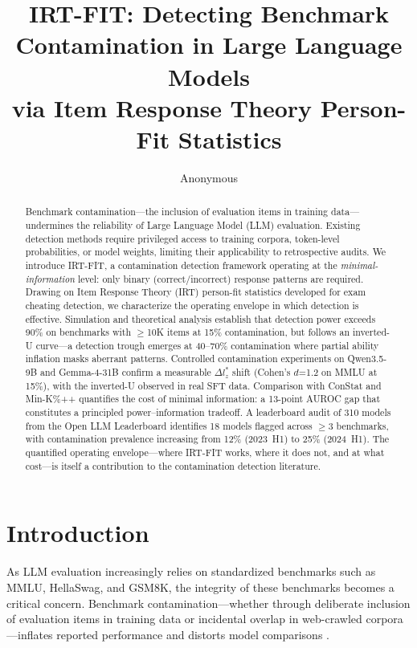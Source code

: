 \documentclass[11pt,a4paper]{article}
\title{IRT-FIT: Detecting Benchmark Contamination in Large Language Models\\via Item Response Theory Person-Fit Statistics}
\author{Anonymous}
\date{}
\begin{document}
\maketitle

\begin{abstract}
Benchmark contamination---the inclusion of evaluation items in training data---undermines the reliability of Large Language Model (LLM) evaluation.
Existing detection methods require privileged access to training corpora, token-level probabilities, or model weights, limiting their applicability to retrospective audits.
We introduce \textsc{IRT-FIT}, a contamination detection framework operating at the \emph{minimal-information} level: only binary (correct/incorrect) response patterns are required.
Drawing on Item Response Theory (IRT) person-fit statistics developed for exam cheating detection, we characterize the operating envelope in which detection is effective.
Simulation and theoretical analysis establish that detection power exceeds 90\% on benchmarks with $\geq$10K items at 15\% contamination, but follows an inverted-U curve---a detection trough emerges at 40--70\% contamination where partial ability inflation masks aberrant patterns.
Controlled contamination experiments on Qwen3.5-9B and Gemma-4-31B confirm a measurable $\Delta l_{z}^{*}$ shift (Cohen's $d$=1.2 on MMLU at 15\%), with the inverted-U observed in real SFT data.
Comparison with ConStat and Min-K\%++ quantifies the cost of minimal information: a 13-point AUROC gap that constitutes a principled power--information tradeoff.
A leaderboard audit of 310 models from the Open LLM Leaderboard identifies 18 models flagged across $\geq$3 benchmarks, with contamination prevalence increasing from 12\% (2023~H1) to 25\% (2024~H1).
The quantified operating envelope---where IRT-FIT works, where it does not, and at what cost---is itself a contribution to the contamination detection literature.
\end{abstract}

\section{Introduction}

As LLM evaluation increasingly relies on standardized benchmarks such as MMLU, HellaSwag, and GSM8K, the integrity of these benchmarks becomes a critical concern.
Benchmark contamination---whether through deliberate inclusion of evaluation items in training data or incidental overlap in web-crawled corpora---inflates reported performance and distorts model comparisons \citep{zhou2023contamination,yang2023rethinking}.
\end{document}
